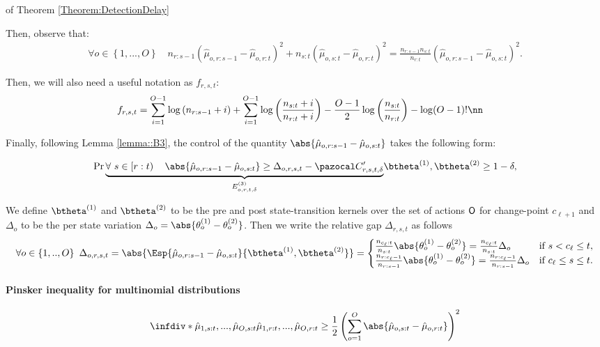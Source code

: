 \documentclass{article} %
\begin{document}
\begin{myproof}{of Theorem \ref{Theorem:DetectionDelay}}
 
	Then, observe that:
	\begin{align}
\forall o \in \left\lbrace1,...,O \right\rbrace	\quad  n_{r:s-1} \left( \hat{\mu}_{o,r:s-1} -\hat{\mu}_{o,r:t}\right)^2 +n_{s:t} \left( \hat{\mu}_{o,s:t} -\hat{\mu}_{o,r:t} \right)^2 = \frac{n_{r:s-1}n_{s:t}}{n_{r:t}} \left( \hat{\mu}_{o,r:s-1} -\hat{\mu}_{o,s:t} \right)^2. \label{Eq_Rec}
	\end{align}
	
	Then, we will also need a useful notation as $f_{r,s,t}$:
	\begin{align}
	f_{r,s,t} &= \sum_{i=1}^{O-1} \log \left( n_{r:s-1}+i  \right) + \sum_{i=1}^{O-1} \log \left( \frac{n_{s:t}+i}{n_{r:t}+i}  \right) - \frac{O-1}{2} \log \left( \frac{n_{s:t}}{n_{r:t}} \right) - \log(O-1)! \nn 
	\end{align}
	
	Finally, following Lemma \ref{lemma::B3}, the control of the quantity $\abs{\hat{\mu}_{o,r:s-1}-\hat{\mu}_{o,s:t}}$ takes the following form: 
	
	\begin{align}
	\Pr{\underbrace{\forall\  s \in \left[r:t\right) \quad
	\abs{\hat{\mu}_{o,r:s-1}-\hat{\mu}_{o,s:t}} \geq \Delta_{o,r,s,t} - \pC^\prime_{r,s,t,\delta}}_{E^{(3)}_{o,r,t,\delta}}}{\btheta^{(1)},\btheta^{(2)}} \geq 1-\delta,
	\label{LapCor}
	\end{align}


We define $\btheta^{(1)}$ and $\btheta^{(2)}$ to be the pre and post state-transition kernels over the set of actions ${\mathsf{O}}$ for change-point $c_{\ell+1}$ and $\Delta_o$ to be the per state variation $\Delta_o = \abs{\theta^{(1)}_o -  \theta^{(2)}_o}$. Then we write the relative gap $\Delta_{r,s,t}$ as follows
	\begin{align}
 \forall o \in \left\lbrace 1,..,O \right\rbrace \ 
	\Delta_{o,r,s,t} = \abs{\Esp{\hat{\mu}_{o,r:s-1}-\hat{\mu}_{o,s:t}}{\btheta^{(1)},\btheta^{(2)}}} = 
	\begin{cases}
	\frac{n_{c_\ell:t}}{ n_{s:t}} \abs{\theta^{(1)}_o- \theta^{(2)}_o} = \frac{n_{c_\ell:t}}{ n_{s:t}} \Delta_o & \text{if }  s < c_\ell\leq t, \\
	\frac{ n_{r:c_\ell-1}}{ n_{r:s-1}}\abs{\theta^{(1)}_o- \theta^{(2)}_o} = \frac{ n_{r:c_\ell-1}}{ n_{r:s-1}} \Delta_o & \text{if }  c_\ell\leq s \leq t.
	\end{cases}
	\label{Eq::Delta}
	\end{align}


\paragraph{Pinsker inequality for multinomial distributions}
 \begin{align}
     \infdiv*{\hat{\mu}_{1,s:t},...,\hat{\mu}_{O,s:t}}{\hat{\mu}_{1,r:t},..., \hat{\mu}_{O,r:t}} 
     \geq \frac{1}{2} \left( \sum_{o=1}^{O} \abs{\hat{\mu}_{o,s:t} - \hat{\mu}_{o,r:t}} \right)^2
     \label{eq::Pinsker}
 \end{align}


\end{myproof}
\end{document}
